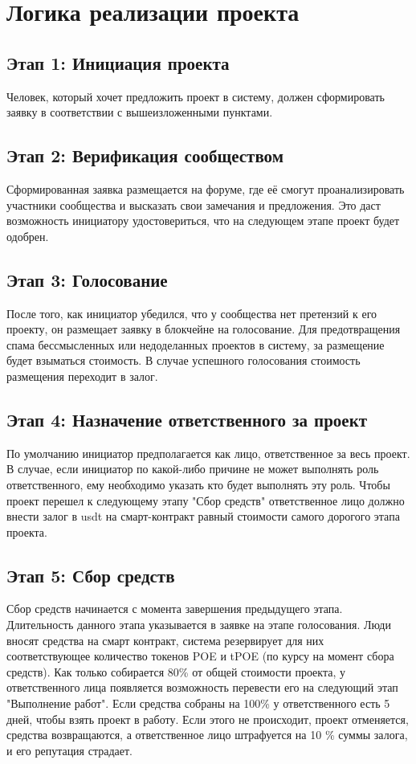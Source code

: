 \documentclass[a4paper,12pt]{report}
\begin{document}
\section{Логика реализации проекта}

\subsection{Этап 1: Инициация проекта}
	Человек, который хочет предложить проект в систему, должен сформировать заявку в соответствии с вышеизложенными пунктами. 

\subsection{Этап 2: Верификация сообществом}
	Сформированная заявка размещается на форуме, где её смогут проанализировать участники сообщества и высказать свои замечания и предложения. Это даст возможность инициатору удостовериться, что на следующем этапе проект будет одобрен.

\subsection{Этап 3: Голосование}
	После того, как инициатор убедился, что у сообщества нет претензий к его проекту, он размещает заявку в блокчейне на голосование. Для предотвращения  спама бессмысленных или недоделанных проектов в систему, за размещение будет взыматься стоимость. В случае успешного голосования стоимость размещения переходит в залог.

\subsection{Этап 4: Назначение ответственного за проект}
	По умолчанию инициатор предполагается как лицо, ответственное за весь проект. В случае, если инициатор по какой-либо причине не может выполнять роль ответственного, ему необходимо указать кто будет выполнять эту роль. Чтобы проект перешел к следующему этапу "Сбор средств" ответственное лицо должно внести залог в usdt на смарт-контракт равный стоимости самого дорогого этапа проекта.

\subsection{Этап 5: Сбор средств}
	Сбор средств начинается с момента завершения предыдущего этапа. Длительность данного этапа указывается в заявке на этапе голосования. Люди вносят средства на смарт контракт, система резервирует для них соответствующее количество токенов POE и tPOE (по курсу на момент сбора средств). Как только собирается 80\% от общей стоимости проекта, у ответственного лица появляется возможность перевести его на следующий этап "Выполнение работ". Если средства собраны на 100\% у ответственного есть 5 дней, чтобы взять проект в работу. Если этого не происходит, проект отменяется, средства возвращаются, а ответственное лицо штрафуется на 10 \% суммы залога, и его репутация страдает. 
\end{document}
